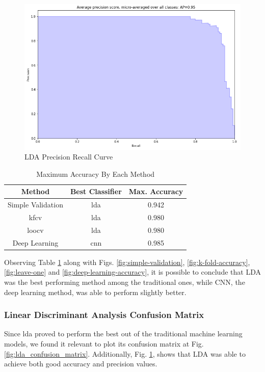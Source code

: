 \documentclass[conference]{IEEEtran}
\begin{document}
\begin{figure}
    \centering
    \includegraphics[scale=0.5]{images/9_precision_recall_roc_curves.png}
    \caption{LDA Precision Recall Curve}
    \label{fig:precision_recall_roc_curves}
\end{figure}


\begin{table}
\caption{Maximum Accuracy By Each Method}
\begin{center}
\begin{tabular}{|c|c|c|}
\hline
\textbf{Method} & \textbf{Best Classifier} & \textbf{Max. Accuracy} \\
\cline{1-2} 
\hline
Simple Validation & \gls{lda} & 0.942 \\
\hline
\gls{kfcv} & \gls{lda} & 0.980 \\
\hline
\gls{loocv} & \gls{lda} & 0.980  \\
\hline
Deep Learning & \gls{cnn} & 0.985\\

\hline
\end{tabular}
\label{methods-table}
\end{center}
\end{table}

Observing Table \ref{methods-table} along with Figs. \ref{fig:simple-validation}, \ref{fig:k-fold-accuracy}, \ref{fig:leave-one} and \ref{fig:deep-learning-accuracy}, it is possible to conclude that LDA was the best performing method among the traditional ones, while CNN, the deep learning method, was able to perform slightly better.

\subsubsection{Linear Discriminant Analysis Confusion Matrix}
Since \gls{lda} proved to perform the best out of the traditional machine learning models, we found it relevant to plot its confusion matrix at Fig. \ref{fig:lda_confusion_matrix}. Additionally, Fig. \ref{fig:precision_recall_roc_curves}, shows that LDA was able to achieve both good accuracy and precision values.
\end{document}
